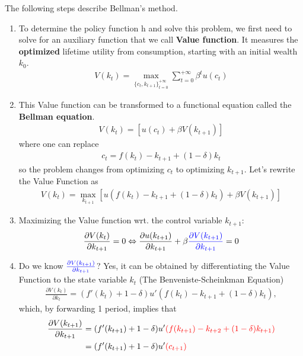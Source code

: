 \documentclass[11pt,a4paper]{book}
\newcommand{\red}[1]{\textcolor{red}{#1}}
\newcommand{\blue}[1]{\textcolor{blue}{#1}}
\theoremstyle{definition}\newtheorem{definition}{Definition}
\theoremstyle{definition}\newtheorem{fact}{Fact}
\theoremstyle{definition}\newtheorem{remark}{Remark}
\theoremstyle{definition}\newtheorem{ex}{Ex.}
\theoremstyle{definition}\newtheorem{project}{Project}
\theoremstyle{definition}\newtheorem{problem}{Problem}
\theoremstyle{definition}\newtheorem{example}{Example}
\numberwithin{theorem}{section}
\numberwithin{corollary}{chapter}
\numberwithin{assumption}{chapter}
\numberwithin{definition}{chapter}
\numberwithin{prop}{chapter}
\numberwithin{notation}{chapter}
\numberwithin{problem}{chapter}
\numberwithin{example}{chapter}
\numberwithin{fact}{chapter}
\numberwithin{ex}{chapter}
\begin{document}
	The following steps describe Bellman's method.
	\begin{enumerate}
		\item To determine the policy function h and solve this problem, we first need to solve for
		an auxiliary function that we call \textbf{Value function}. It measures the \textbf{optimized} lifetime utility from consumption, starting with an initial wealth $k_0$.
		\begin{align*}
			V(k_t) = \max_{ \{c_t, k_{t+1}\}^{+\infty}_{t=0}  } \sum^{+\infty}_{t=0} \beta^t u(c_t)
		\end{align*}
		\item This Value function can be transformed to a functional equation called the \textbf{Bellman equation}. 
		\begin{align}
			V(k_t) =  \left[ u(c_t) + \beta V(k_{t+1}) \right] \label{eq:bellman}
		\end{align}
		where one can replace
		\begin{align*}
			c_t = f(k_t) - k_{t+1} + (1-\delta) k_t
		\end{align*}
		so the problem changes from optimizing $c_t$ to optimizing $k_{t+1}$. Let's rewrite the Value Function as
		\begin{align*}
			V(k_t) = \max_{k_{t+1}} \left[ u(f(k_t) - k_{t+1} + (1-\delta)k_t) +\beta V(k_{t+1}) \right] 
		\end{align*}
		\item Maximizing the Value function wrt. the control variable $k_{t+1}$:
		\begin{align*}
			\frac{\partial V(k_t)}{\partial k_{t+1}} = 0 \Leftrightarrow \frac{\partial u(k_{t+1})}{\partial k_{t+1}} + \beta \blue{\frac{\partial V(k_{t+1})}{\partial k_{t+1}}} = 0 
		\end{align*}
		\item Do we know $\blue{\frac{\partial V(k_{t+1})}{\partial k_{t+1}}}$? Yes, it can be obtained by differentiating the Value Function to the state variable $k_t$ (The Benveniste-Scheinkman Equation)
		\begin{align*}
			\frac{\partial V(k_t)}{\partial k_t} = (f'(k_t) + 1-\delta) u'( f(k_t) - k_{t+1} + (1-\delta)k_t ), 
		\end{align*}
		which, by forwarding 1 period, implies that
		\begin{align*}
			\frac{\partial V(k_{t+1})}{\partial k_{t+1}} &= (f'(k_{t+1}) + 1-\delta) u'\red{( f(k_{t+1}) - k_{t+2} + (1-\delta)k_{t+1} )} \\
			&= (f'(k_{t+1}) + 1-\delta)u'\red{ (c_{t+1})}

\end{align*}
\end{enumerate}
\end{document}
